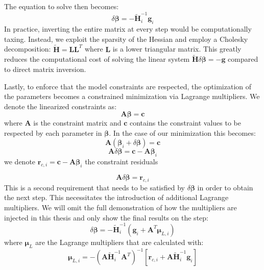 The equation to solve then becomes:
\begin{equation}
    \delta \boldsymbol{\beta} = - \tilde{\mathbf{H}}_i^{-1} \mathbf{g}_i
\end{equation}
In practice, inverting the entire matrix at every step would be computationally taxing. Instead, we exploit the sparsity of the Hessian 
and employ a Cholesky decomposition: $\tilde{\mathbf{H}} = \mathbf{L}\mathbf{L}^T$ where $\mathbf{L}$ is a lower triangular matrix. 
This greatly reduces the computational cost of solving the linear 
system $\tilde{\mathbf{H}}\delta\boldsymbol{\beta} = -\mathbf{g}$ 
compared to direct matrix inversion.

Lastly, to enforce that the model constraints are respected, 
the optimization of the parameters becomes a constrained minimization via Lagrange multipliers. We denote the linearized constraints as:
\begin{equation}
    \mathbf{A}\boldsymbol{\beta} = \mathbf{c}
\end{equation}
where $\mathbf{A}$ is the constraint matrix and $\mathbf{c}$ contains the constraint values to be respected by each parameter in $\boldsymbol{\beta}$. In the case of our minimization this becomes:
\begin{equation}
    \mathbf{A}(\boldsymbol{\beta}_i + \delta \boldsymbol{\beta}) = \mathbf{c}
\end{equation}
\begin{equation}
    \mathbf{A}\delta \boldsymbol{\beta} = \mathbf{c} - \mathbf{A}\boldsymbol{\beta}_i
\end{equation}
we denote $\mathbf{r}_{c,i} = \mathbf{c} - \mathbf{A}\boldsymbol{\beta}_i$ the constraint residuals

\begin{equation}
    \mathbf{A}\delta \boldsymbol{\beta} = \mathbf{r}_{c,i}
\end{equation}
This is a second requirement that needs to be satisfied by $\delta \boldsymbol{\beta}$ in order to obtain the next step. 
This necessitates the introduction of additional Lagrange multipliers. We will omit the full demonstration of how the multipliers are injected in this thesis and only show the 
final results on the step:
\begin{equation}
    \delta \boldsymbol{\beta} = - \tilde{\mathbf{H}}_i^{-1} (\mathbf{g}_i + \mathbf{A}^T \boldsymbol{\mu}_{L,i})
\end{equation}
where $\boldsymbol{\mu}_{L}$ are the Lagrange multipliers that are calculated with:
\begin{equation}
    \boldsymbol{\mu}_{L,i} = - \left( \mathbf{A} \tilde{\mathbf{H}}_i^{-1} \mathbf{A}^T\right)^{-1} \left[ \mathbf{r}_{c,i} + \mathbf{A} \tilde{\mathbf{H}}_i^{-1} \mathbf{g}_i \right]
\end{equation}

